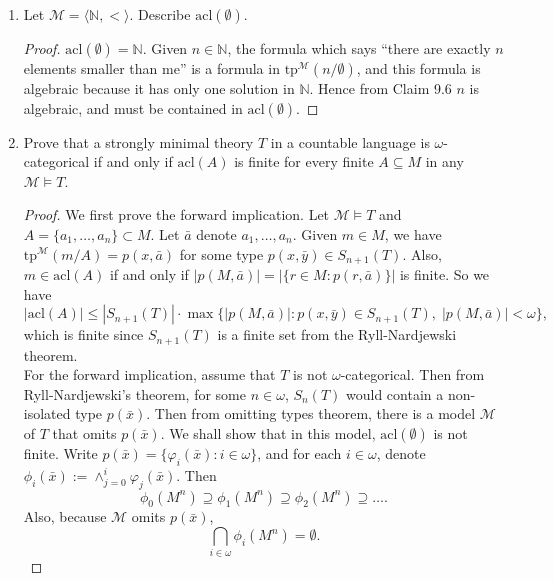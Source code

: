 \documentclass{article}
\begin{document}
\begin{enumerate}[label={\bf Q\arabic*:}]
\begin{proof}
      Thus, $T$ is strongly minimal.
    \end{proof}

  \item Let $\mathcal{M}=\langle\mathbb{N},<\rangle$. Describe
    $\text{acl}(\emptyset)$.

    \begin{proof}
      $\text{acl}(\emptyset)=\mathbb{N}$. Given $n\in\mathbb{N}$, the
      formula which says ``there are exactly $n$ elements
      smaller than me'' is a formula in
      $\text{tp}^\mathcal{M}(n/\emptyset)$, and this formula is algebraic
      because it has only one solution in $\mathbb{N}$. Hence from Claim
      9.6 $n$ is algebraic, and must be contained in
      $\text{acl}(\emptyset)$.
    \end{proof}

  \item Prove that a strongly minimal theory $T$ in a countable language is
    $\omega$-categorical if and only if $\text{acl}(A)$ is finite for
    every finite $A\subseteq M$ in any $\mathcal{M}\models T$. 

    \begin{proof}
      We first prove the forward implication. Let $\mathcal{M}\models T$
      and $A=\{a_1,\ldots,a_n\}\subset M$. Let $\bar{a}$ denote
      $a_1,\ldots,a_n$. Given $m\in M$, we have
      $\text{tp}^\mathcal{M}(m/A)=p(x,\bar{a})$ for some type
      $p(x,\bar{y})\in S_{n+1}(T)$. Also, $m\in\text{acl}(A)$ if and only
      if $|p(M,\bar{a})|=|\{r\in M: p(r,\bar{a})\}|$ is finite. So we have
      \[|\text{acl}(A)|\leq|S_{n+1}(T)|\cdot
      \max\{|p(M,\bar{a})|:p(x,\bar{y})\in S_{n+1}(T),\;
      |p(M,\bar{a})|<\omega\},\] which is finite since $S_{n+1}(T)$ is a
      finite set from the Ryll-Nardjewski theorem. \\

      For the forward implication, assume that $T$ is not
      $\omega$-categorical. Then from Ryll-Nardjewski's theorem, for some
      $n\in\omega$, $S_n(T)$ would contain a non-isolated type
      $p(\bar{x})$. Then from omitting types theorem, there is a model
      $\mathcal{M}$ of $T$ that omits $p(\bar{x})$. We shall show that in
      this model, $\text{acl}(\emptyset)$ is not finite. Write
      $p(\bar{x})=\{\varphi_i(\bar{x}):i\in\omega\}$, and for each
      $i\in\omega$, denote
      $\phi_i(\bar{x}):=\wedge_{j=0}^i\varphi_j(\bar{x})$. Then
      \[\phi_0(M^n)\supseteq \phi_1(M^n)\supseteq
      \phi_2(M^n)\supseteq\ldots.\] Also, 
      because $\mathcal{M}$ omits $p(\bar{x})$,
      \[\bigcap_{i\in\omega} \phi_i(M^n) =\emptyset.\]


\end{proof}
\end{enumerate}
\end{document}
